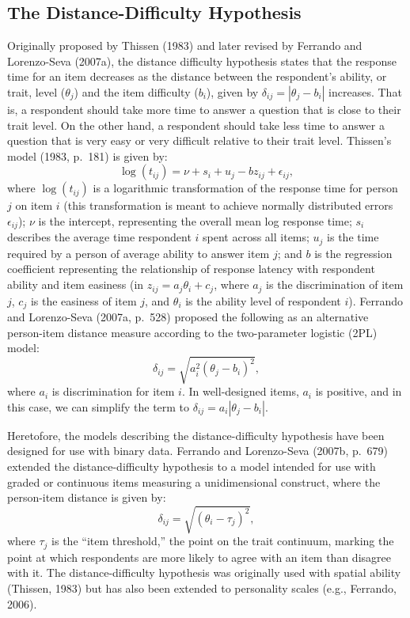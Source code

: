 \documentclass[
]{agujournal2019}
\begin{document}
\subsection{The Distance-Difficulty
Hypothesis}\label{the-distance-difficulty-hypothesis}

Originally proposed by Thissen (1983) and later revised by Ferrando and
Lorenzo-Seva (2007a), the distance difficulty hypothesis states that the
response time for an item decreases as the distance between the
respondent's ability, or trait, level (\(\theta_j\)) and the item
difficulty (\(b_i\)), given by \(\delta_{ij}=|θ_j-b_i|\) increases. That
is, a respondent should take more time to answer a question that is
close to their trait level. On the other hand, a respondent should take
less time to answer a question that is very easy or very difficult
relative to their trait level. Thissen's model (1983, p.~181) is given
by: \[ \log{(t_{ij})} = \nu + s_i+u_j - bz_{ij}+\epsilon_{ij},\] where
\(\log{(t_{ij})}\) is a logarithmic transformation of the response time
for person \(j\) on item \(i\) (this transformation is meant to achieve
normally distributed errors \(\epsilon_{ij}\)); \(\nu\) is the
intercept, representing the overall mean log response time; \(s_i\)
describes the average time respondent \(i\) spent across all items;
\(u_j\) is the time required by a person of average ability to answer
item \(j\); and \(b\) is the regression coefficient representing the
relationship of response latency with respondent ability and item
easiness (in \(z_{ij}=a_j θ_i+c_j\), where \(a_j\) is the discrimination
of item \(j\), \(c_j\) is the easiness of item \(j\), and \(θ_i\) is the
ability level of respondent \(i\)). Ferrando and Lorenzo-Seva (2007a,
p.~528) proposed the following as an alternative person-item distance
measure according to the two-parameter logistic (2PL) model:
\[\delta_{ij}=\sqrt{a_i^2 (θ_j-b_i )^2},\] where \(a_i\) is
discrimination for item \(i\). In well-designed items, \(a_i\) is
positive, and in this case, we can simplify the term to
\(\delta_{ij}=a_i|θ_j-b_i|\).

Heretofore, the models describing the distance-difficulty hypothesis
have been designed for use with binary data. Ferrando and Lorenzo-Seva
(2007b, p.~679) extended the distance-difficulty hypothesis to a model
intended for use with graded or continuous items measuring a
unidimensional construct, where the person-item distance is given by:
\[\delta_{ij}=\sqrt{(θ_i-τ_j)^2},\] where \(\tau_j\) is the ``item
threshold,'' the point on the trait continuum, marking the point at
which respondents are more likely to agree with an item than disagree
with it. The distance-difficulty hypothesis was originally used with
spatial ability (Thissen, 1983) but has also been extended to
personality scales (e.g., Ferrando, 2006).
\end{document}
